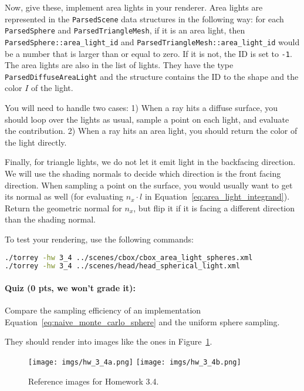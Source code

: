 Now, give these, implement area lights in your renderer. Area lights are represented in the \lstinline{ParsedScene} data structures in the following way: for each \lstinline{ParsedSphere} and \lstinline{ParsedTriangleMesh}, if it is an area light, then \lstinline{ParsedSphere::area_light_id} and \lstinline{ParsedTriangleMesh::area_light_id} would be a number that is larger than or equal to zero. If it is not, the ID is set to \lstinline{-1}. The area lights are also in the list of lights. They have the type \lstinline{ParsedDiffuseAreaLight} and the structure contains the ID to the shape and the color $I$ of the light.

You will need to handle two cases: 1) When a ray hits a diffuse surface, you should loop over the lights as usual, sample a point on each light, and evaluate the contribution. 2) When a ray hits an area light, you should return the color of the light directly.

Finally, for triangle lights, we do not let it emit light in the backfacing direction. We will use the shading normals to decide which direction is the front facing direction. When sampling a point on the surface, you would usually want to get its normal as well (for evaluating $n_x \cdot l$ in Equation~\eqref{eq:area_light_integrand}). Return the geometric normal for $n_x$, but flip it if it is facing a different direction than the shading normal.

To test your rendering, use the following commands:
\begin{lstlisting}[language=bash]
./torrey -hw 3_4 ../scenes/cbox/cbox_area_light_spheres.xml
./torrey -hw 3_4 ../scenes/head/head_spherical_light.xml
\end{lstlisting}

\paragraph{Quiz (0 pts, we won't grade it):} Compare the sampling efficiency of an implementation Equation~\eqref{eq:naive_monte_carlo_sphere} and the uniform sphere sampling.

They should render into images like the ones in Figure~\ref{fig:hw_3_4}. 

\begin{figure}[ht]
    \centering
    \texttt{[image: imgs/hw\_3\_4a.png]}
    \texttt{[image: imgs/hw\_3\_4b.png]}
    \caption{Reference images for Homework 3.4.}
    \label{fig:hw_3_4}
\end{figure}

